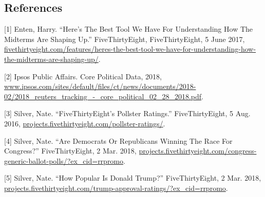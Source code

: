 \documentclass[]{article}
\begin{document}
\subsection{References}\label{references}

{[}1{]} Enten, Harry. ``Here's The Best Tool We Have For Understanding
How The Midterms Are Shaping Up.'' FiveThirtyEight, FiveThirtyEight, 5
June 2017,
\url{fivethirtyeight.com/features/heres-the-best-tool-we-have-for-understanding-how-the-midterms-are-shaping-up/}.

{[}2{]} Ipsos Public Affairs. Core Political Data, 2018,
\url{www.ipsos.com/sites/default/files/ct/news/documents/2018-02/2018_reuters_tracking_-_core_political_02_28_2018.pdf}.

{[}3{]} Silver, Nate. ``FiveThirtyEight's Pollster Ratings.''
FiveThirtyEight, 5 Aug. 2016,
\url{projects.fivethirtyeight.com/pollster-ratings/}.

{[}4{]} Silver, Nate. ``Are Democrats Or Republicans Winning The Race
For Congress?'' FiveThirtyEight, 2 Mar. 2018,
\url{projects.fivethirtyeight.com/congress-generic-ballot-polls/?ex_cid=rrpromo}.

{[}5{]} Silver, Nate. ``How Popular Is Donald Trump?'' FiveThirtyEight,
2 Mar. 2018,
\url{projects.fivethirtyeight.com/trump-approval-ratings/?ex_cid=rrpromo}.
\end{document}
